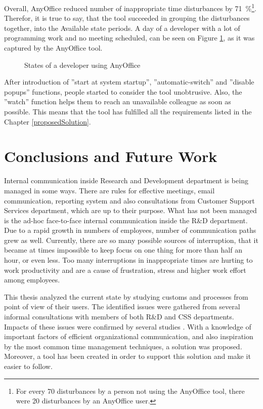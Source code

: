 \documentclass[11pt,singleside]{myfithesis2}
\newcommand{\pict}[4]{
	\begin{figure}[h!]
  		\vspace{-7px}
  		\centerline{\fcolorbox{darkgray}{palegray}{\texttt{[image: \#2]}}}
  		\caption{#1}
  		\label{#4}
	\end{figure}
}
\begin{document}
Overall, AnyOffice reduced number of inappropriate time disturbances by 71~\%\footnote{For every 70 disturbances by a person not using the AnyOffice tool, there were 20 disturbances by an AnyOffice user.}. Therefor, it is true to say, that the tool succeeded in grouping the disturbances together, into the Available state periods. A day of a developer with a lot of programming work and no meeting scheduled, can be seen on Figure \ref{pic:anyOfficeStatesFinal}, as it was captured by the AnyOffice tool.

\pict{States of a developer using AnyOffice}{data/anyOfficeStatesFinal.png}{width=1\textwidth}{pic:anyOfficeStatesFinal}

After introduction of ''start at system startup'', ''automatic-switch'' and ''disable popups'' functions, people started to consider the tool unobtrusive. Also, the ''watch'' function helps them to reach an unavailable colleague as soon as possible. This means that the tool has fulfilled all the requirements listed in the Chapter \ref{proposedSolution}.


\chapter{Conclusions and Future Work}
Internal communication inside Research and Development department is being managed in some ways. There are rules for effective meetings, email communication, reporting system and also consultations from Customer Support Services department, which are up to their purpose. What has not been managed is the ad-hoc face-to-face internal communication inside the R\&D department. Due to a rapid growth in numbers of employees, number of communication paths grew as well. Currently, there are so many possible sources of interruption, that it became at times impossible to keep focus on one thing for more than half an hour, or even less. Too many interruptions in inappropriate times are hurting to work productivity and are a cause of frustration, stress and higher work effort among employees.

This thesis analyzed the current state by studying customs and processes from point of view of their users. The identified issues were gathered from several informal consultations with members of both R\&D and CSS departments. Impacts of these issues were confirmed by several studies \cite{studySpeedAndStress, studyAttention, studyDealingWithInterruptions, studyResumptionStrategies}. With a knowledge of important factors of efficient organizational communication, and also inspiration by the most common time management techniques, a solution was proposed. Moreover, a tool has been created in order to support this solution and make it easier to follow.
\end{document}
